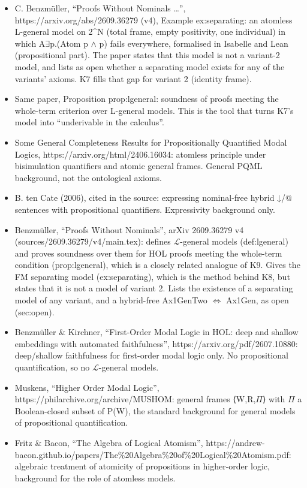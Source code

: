 \documentclass{article}
\begin{document}
\begin{itemize}
\item C. Benzmüller, ``Proofs Without Nominals \ldots{}'', https://arxiv.org/abs/2609.36279 (v4), Example ex:separating: an atomless L-general model on 2\textasciicircum{}N (total frame, empty positivity, one individual) in which A$\exists$p.(Atom p $\wedge$ p) fails everywhere, formalised in Isabelle and Lean (propositional part). The paper states that this model is not a variant-2 model, and lists as open whether a separating model exists for any of the variants' axioms. K7 fills that gap for variant 2 (identity frame).
\item Same paper, Proposition prop:lgeneral: soundness of proofs meeting the whole-term criterion over L-general models. This is the tool that turns K7's model into ``underivable in the calculus''.
\item Some General Completeness Results for Propositionally Quantified Modal Logics, https://arxiv.org/html/2406.16034: atomless principle under bisimulation quantifiers and atomic general frames. General PQML background, not the ontological axioms.
\item B. ten Cate (2006), cited in the source: expressing nominal-free hybrid ↓/@ sentences with propositional quantifiers. Expressivity background only.
\item Benzmüller, ``Proofs Without Nominals'', arXiv 2609.36279 v4 (sources/2609.36279/v4/main.tex): defines $\mathcal L$-general models (def:lgeneral) and proves soundness over them for HOL proofs meeting the whole-term condition (prop:lgeneral), which is a closely related analogue of K9. Gives the FM separating model (ex:separating), which is the method behind K8, but states that it is not a model of variant 2. Lists the existence of a separating model of any variant, and a hybrid-free Ax1GenTwo $\Leftrightarrow$ Ax1Gen, as open (sec:open).
\item Benzmüller \& Kirchner, ``First-Order Modal Logic in HOL: deep and shallow embeddings with automated faithfulness'', https://arxiv.org/pdf/2607.10880: deep/shallow faithfulness for first-order modal logic only. No propositional quantification, so no $\mathcal L$-general models.
\item Muskens, ``Higher Order Modal Logic'', https://philarchive.org/archive/MUSHOM: general frames ⟨W,R,$\Pi$⟩ with $\Pi$ a Boolean-closed subset of P(W), the standard background for general models of propositional quantification.
\item Fritz \& Bacon, ``The Algebra of Logical Atomism'', https://andrew-bacon.github.io/papers/The\%20Algebra\%20of\%20Logical\%20Atomism.pdf: algebraic treatment of atomicity of propositions in higher-order logic, background for the role of atomless models.

\end{itemize}
\end{document}

